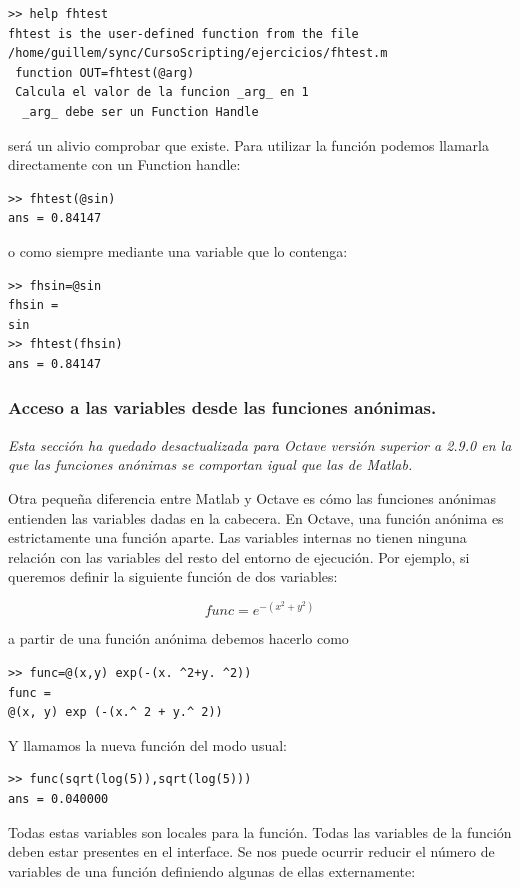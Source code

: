 \begin{lstlisting}
>> help fhtest
fhtest is the user-defined function from the file
/home/guillem/sync/CursoScripting/ejercicios/fhtest.m
 function OUT=fhtest(@arg)
 Calcula el valor de la funcion _arg_ en 1
  _arg_ debe ser un Function Handle
\end{lstlisting}
será un alivio comprobar que existe.  Para utilizar la función podemos
llamarla directamente con un Function handle:

\begin{lstlisting}
>> fhtest(@sin)
ans = 0.84147
\end{lstlisting}
o como siempre mediante una variable que lo contenga:

\begin{lstlisting}
>> fhsin=@sin
fhsin =
sin
>> fhtest(fhsin)
ans = 0.84147
\end{lstlisting}


\subsubsection{Acceso a las variables desde las funciones anónimas.}

\emph{Esta sección ha quedado desactualizada para Octave versión
  superior a 2.9.0 en la que las funciones anónimas se comportan igual
  que las de Matlab.}

Otra pequeña diferencia entre Matlab y Octave es cómo las funciones
anónimas entienden las variables dadas en la cabecera. En Octave, una
función anónima es estrictamente una función aparte. Las variables
internas no tienen ninguna relación con las variables del resto del
entorno de ejecución. Por ejemplo, si queremos definir la siguiente
función de dos variables:

$$func=e^{-(x^{2}+y^{2})}$$

a partir de una función anónima debemos hacerlo como

\begin{lstlisting}
>> func=@(x,y) exp(-(x. ^2+y. ^2)) 
func =
@(x, y) exp (-(x.^ 2 + y.^ 2)) 
\end{lstlisting}
Y llamamos la nueva función del modo usual:

\begin{lstlisting}
>> func(sqrt(log(5)),sqrt(log(5)))
ans = 0.040000 
\end{lstlisting}
Todas estas variables son locales para la función. Todas las variables
de la función deben estar presentes en el interface. Se nos puede
ocurrir reducir el número de variables de una función definiendo
algunas de ellas externamente:

